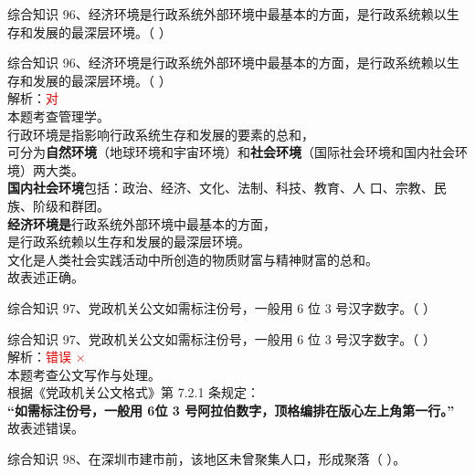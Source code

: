 \documentclass[aspectratio=169]{beamer}
\begin{document}
\begin{frame}[t]{综合知识}
    96、经济环境是行政系统外部环境中最基本的方面，是行政系统赖以生存和发展的最深层环境。（ ）
\end{frame}                           
\begin{frame}[t]{综合知识}
    96、经济环境是行政系统外部环境中最基本的方面，是行政系统赖以生存和发展的最深层环境。（ ）\\
    解析：\textcolor{red}{对 \checkmark}\\
    本题考查管理学。\\
    行政环境是指影响行政系统生存和发展的要素的总和，\\
    可分为\textbf{自然环境}（地球环境和宇宙环境）和\textbf{社会环境}（国际社会环境和国内社会环境）两大类。\\
    \textbf{国内社会环境}包括：政治、经济、文化、法制、科技、教育、人
    口、宗教、民族、阶级和群团。\\
    \textbf{经济环境是}行政系统外部环境中最基本的方面，\\
    是行政系统赖以生存和发展的最深层环境。\\
    文化是人类社会实践活动中所创造的物质财富与精神财富的总和。\\
    故表述正确。
\end{frame}                           


\begin{frame}[t]{综合知识}
    97、党政机关公文如需标注份号，一般用 6 位 3 号汉字数字。（ ）
\end{frame}                           
\begin{frame}[t]{综合知识}
    97、党政机关公文如需标注份号，一般用 6 位 3 号汉字数字。（ ）\\
    解析：\textcolor{red}{错误 $\times$}\\
    本题考查公文写作与处理。\\
    根据《党政机关公文格式》第 7.2.1 条规定：\\
    \textbf{“如需标注份号，一般用 6位 3 号阿拉伯数字，顶格编排在版心左上角第一行。”}\\
    故表述错误。
\end{frame}                           


\begin{frame}[t]{综合知识}
    98、在深圳市建市前，该地区未曾聚集人口，形成聚落（ ）。
\end{frame}                           
\end{document}
